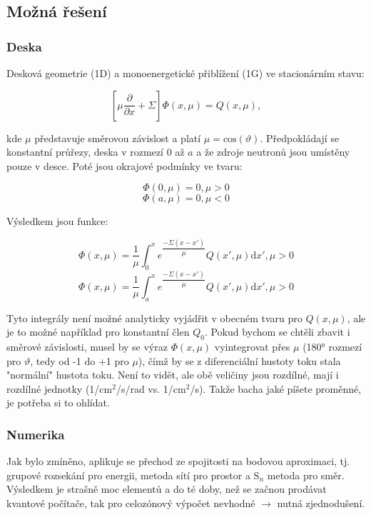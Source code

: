 \subsection{Možná řešení}

\subsubsection{Deska}

Desková geometrie (1D) a monoenergetické přiblížení (1G) ve stacionárním stavu:

$$\left [ \mu \dfrac{\partial}{\partial x} + \Sigma \right ] \Phi(x, \mu) = Q(x, \mu),$$

\noindent kde $\mu$ představuje směrovou závislost a platí $\mu = \text{cos}(\vartheta)$. Předpokládají se konstantní průřezy, deska v rozmezí $0$ až $a$ a že zdroje neutronů jsou umístěny pouze v desce. Poté jsou okrajové podmínky ve tvaru:

$$\Phi(0, \mu) = 0, \mu > 0$$
$$\Phi(a, \mu) = 0, \mu < 0$$

Výsledkem jsou funkce:

$$\Phi(x, \mu) = \dfrac{1}{\mu} \int_0^x e^{\dfrac{-\Sigma (x-x')}{\mu}} Q(x', \mu) \text{d}x', \mu > 0$$
$$\Phi(x, \mu) = \dfrac{1}{\mu} \int_a^x e^{\dfrac{-\Sigma (x-x')}{\mu}} Q(x', \mu) \text{d}x', \mu > 0$$

Tyto integrály není možné analyticky vyjádřit v obecném tvaru pro $Q(x, \mu)$, ale je to možné například pro konstantní člen $Q_0$. Pokud bychom se chtěli zbavit i směrové závislosti, musel by se výraz $\Phi(x, \mu)$ vyintegrovat přes $\mu$ (180° rozmezí pro $\vartheta$, tedy od -1 do +1 pro $\mu$), čímž by se z diferenciální hustoty toku stala "normální" hustota toku. Není to vidět, ale obě veličiny jsou rozdílné, mají i rozdílné jednotky (1/cm$^2$/s/rad vs. 1/cm$^2$/s). Takže bacha jaké píšete proměnné, je potřeba si to ohlídat.

\subsubsection{Numerika}

Jak bylo zmíněno, aplikuje se přechod ze spojitosti na bodovou aproximaci, tj. grupové rozsekání pro energii, metoda sítí pro prostor a S$_n$ metoda pro směr. Výsledkem je strašně moc elementů a do té doby, než se začnou prodávat kvantové počítače, tak pro celozónový výpočet nevhodné $\rightarrow$ nutná zjednodušení.\\

